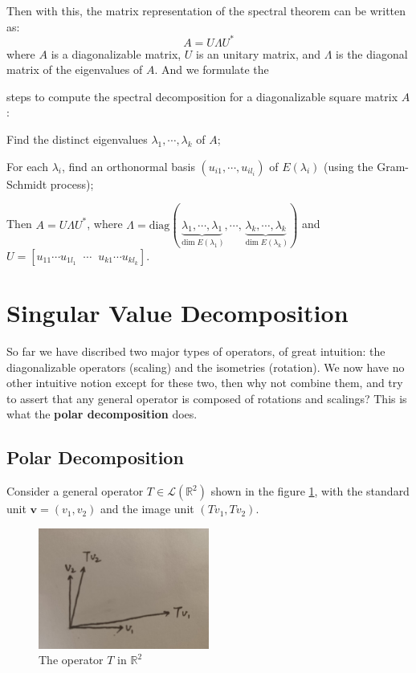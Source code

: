 \documentclass{article}
\begin{document}
Then with this, the matrix representation of the spectral theorem can be written as:
$$ A = U\Lambda U^* $$
where $A$ is a diagonalizable matrix, $U$ is an unitary matrix, and $\Lambda$ is the diagonal matrix of the eigenvalues of $A$. And we formulate the \textcolor{Th}{steps to compute the spectral decomposition for a diagonalizable square matrix $A$:
\begin{compactenum}
    \item Find the distinct eigenvalues $\lambda_1, \cdots, \lambda_k$ of $A$;
    \item For each $\lambda_i$, find an orthonormal basis $(u_{i1},\cdots,u_{il_i})$ of $E(\lambda_i)$ (using the Gram-Schmidt process);
    \item Then $A = U\Lambda U^*$, where $\Lambda = \text{diag}(\underbrace{\lambda_1,\cdots,\lambda_1}_{\dim E(\lambda_1)},\cdots,\underbrace{\lambda_k,\cdots,\lambda_k}_{\dim E(\lambda_k)})$ and $ U = [u_{11} \cdots u_{1l_1} \;\;\cdots\;\; u_{k1} \cdots u_{kl_k}] $.
\end{compactenum}}

\section{Singular Value Decomposition}
So far we have discribed two major types of operators, of great intuition: the diagonalizable operators (scaling) and the isometries (rotation). We now have no other intuitive notion except for these two, then why not combine them, and try to assert that any general operator is composed of rotations and scalings? This is what the \textbf{polar decomposition} does. 

\subsection{Polar Decomposition}
Consider a general operator $T\in\mathcal{L}(\mathbb{R}^2)$ shown in the figure \ref{fig:T_in_R2}, with the standard unit $\pmb{v} = (v_1, v_2)$ and the image unit $(Tv_1, Tv_2)$. 

\begin{figure}[H]
    \centering
    \includegraphics[width=0.5\textwidth]{figs_I2/1.jpg}
    \caption{The operator $T$ in $\mathbb{R}^2$}
    \label{fig:T_in_R2}
\end{figure}
\end{document}

